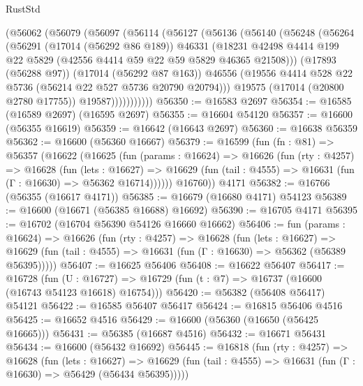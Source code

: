\begin{lexlean}{RustStd}
\begin{coremodule}
{\begin{coremodule}
{{{{{{{{{{{{{{{{{{{{{{{{{{{{{{{{{{{{{{{{{{{{{{{{{{{{{{{          (@56062
            (@56079
              (@56097
                (@56114
                  (@56127
                    (@56136
                      (@56140
                        (@56248
                          (@56264
                            (@56291
                              (@17014 (@56292 @86 @189))
                              @46331
                              (@18231
                                @42498
                                @4414
                                @199
                                @22
                                @5829
                                (@42556 @4414 @59 @22 @59 @5829 @46365 @21508)))
                            (@17893 (@56288 @97))
                            (@17014 (@56292 @87 @163))
                            @46556
                            (@19556 @4414 @528 @22 @5736 (@56214 @22 @527 @5736 @20790 @20794)))
                          @19575
                          (@17014 (@20800 @2780 @17755))
                          @19587)))))))))))
@56350 := @16583 @2697
@56354 := @16585 (@16589 @2697) (@16595 @2697)
@56355 := @16604 @54120
@56357 := @16600 (@56355 @16619)
@56359 := @16642 (@16643 @2697)
@56360 := @16638 @56359
@56362 := @16600 (@56360 @16667)
@56379 := @16599
    (fun (fn : @81) =>
    @56357
      (@16622
        (@16625
          (fun (params : @16624) =>
          @16626
            (fun (rty : @4257) =>
            @16628
              (fun (lets : @16627) =>
              @16629 (fun (tail : @4555) => @16631 (fun (Γ : @16630) => @56362 @16714))))))
        @16760))
    @4171
@56382 := @16766 (@56355 (@16617 @4171))
@56385 := @16679 (@16680 @4171) @54123
@56389 := @16600 (@16671 (@56385 @16688) @16692)
@56390 := @16705 @4171
@56395 := @16702 (@16704 @56390 @54126 @16660 @16662)
@56406 := fun (params : @16624) =>
  @16626
    (fun (rty : @4257) =>
    @16628
      (fun (lets : @16627) =>
      @16629 (fun (tail : @4555) => @16631 (fun (Γ : @16630) => @56362 (@56389 @56395)))))
@56407 := @16625 @56406
@56408 := @16622 @56407
@56417 := @16728
    (fun (U : @16727) => @16729 (fun (t : @7) => @16737 (@16600 (@16743 @54123 @16618) @16754)))
@56420 := @56382 (@56408 @56417) @54121
@56422 := @16585 @56407 @56417
@56424 := @16815 @56406 @4516
@56425 := @16652 @4516
@56429 := @16600 (@56360 (@16650 (@56425 @16665)))
@56431 := @56385 (@16687 @4516)
@56432 := @16671 @56431
@56434 := @16600 (@56432 @16692)
@56445 := @16818
    (fun (rty : @4257) =>
    @16628
      (fun (lets : @16627) =>
      @16629 (fun (tail : @4555) => @16631 (fun (Γ : @16630) => @56429 (@56434 @56395)))))
}}}}}}}}}}}}}}}}}}}}}}}}}}}}}}}}}}}}}}}}}}}}}}}}}}}}}}}
\end{coremodule}}
\end{coremodule}
\end{lexlean}
